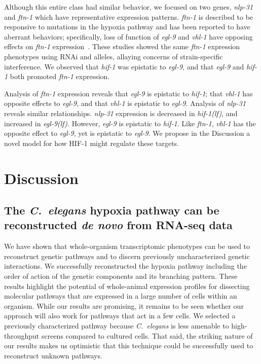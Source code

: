 \documentclass[9pt,twocolumn,twoside]{pnas-new}
\newcommand{\cel}{\emph{C.~elegans}}
\newcommand{\gene}[1]{\mbox{\emph{#1}}}
\newcommand{\nlp}{\gene{nlp-31}}
\newcommand{\ftna}{\gene{ftn-1}}
\newcommand{\egl}{\gene{egl-9(lf)}}
\newcommand{\hif}{\gene{hif-1(lf)}}
\newcommand{\hifp}{HIF-1}
\begin{document}
Although this entire class had similar behavior, we focused on two genes, \nlp{}
and \ftna{} which have representative expression patterns. \ftna{} is described
to be responsive to mutations in the hypoxia pathway and has been reported to
have aberrant behaviors; specifically, loss of function of \gene{egl-9} and
\gene{vhl-1} have opposing effects on \ftna{}
expression~\cite{Ackerman2012,Romney2011}. These studies showed the same \ftna{}
expression phenotypes using RNAi and alleles, allaying concerns of
strain-specific interference. We observed that \gene{hif-1} was epistatic to
\gene{egl-9}, and that \gene{egl-9} and \gene{hif-1} both promoted \ftna{}
expression.

Analysis of \ftna{} expression reveals that \gene{egl-9} is epistatic to
\gene{hif-1}; that \gene{vhl-1} has opposite effects to \gene{egl-9}, and that
\gene{vhl-1} is epistatic to \gene{egl-9}. Analysis of \nlp{} reveals similar
relationships. \nlp{} expression is decreased in \hif{}, and increased in
\egl{}. However, \gene{egl-9} is epistatic to \gene{hif-1}. Like \ftna{},
\gene{vhl-1} has the opposite effect to \gene{egl-9}, yet is epistatic to
\gene{egl-9}. We propose in the Discussion a novel model for how \hifp{} might
regulate these targets.


\section*{Discussion}
\label{sec:discussion}
\subsection*{The \cel{} hypoxia pathway can be reconstructed \emph{de novo} from
             RNA-seq data}
We have shown that whole-organism transcriptomic phenotypes can
be used to reconstruct genetic pathways and to discern previously
uncharacterized genetic interactions. We successfully reconstructed the hypoxia
pathway including the order of action of the genetic components and its
branching pattern.
These results highlight the potential of whole-animal
expression profiles for dissecting molecular pathways that are expressed in a
large number of cells within an organism. While our results are promising, it
remains to be seen whether our approach will also work for pathways that act in
a few cells. We selected a previously characterized pathway because \cel{} is
less amenable to high-throughput screens compared to cultured cells. That said,
the striking nature of our results makes us optimistic that this technique could
be successfully used to reconstruct unknown pathways.
\color{black}
\end{document}
